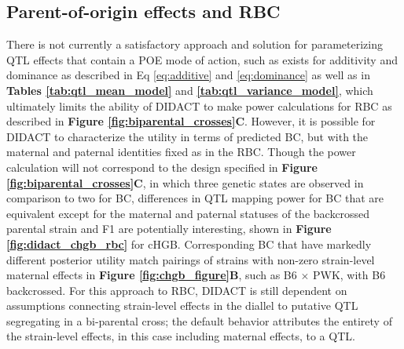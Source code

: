 \subsection{Parent-of-origin effects and RBC}

There is not currently a satisfactory approach and solution for parameterizing QTL effects that contain a POE mode of action, such as exists for additivity and dominance as described in Eq \ref{eq:additive} and \ref{eq:dominance} as well as in \textbf{Tables \ref{tab:qtl_mean_model}} and \textbf{\ref{tab:qtl_variance_model}}, which ultimately limits the ability of DIDACT to make power calculations for RBC as described in \textbf{Figure \ref{fig:biparental_crosses}C}. However, it is possible for DIDACT to characterize the utility in terms of predicted BC, but with the maternal and paternal identities fixed as in the RBC. Though the power calculation will not correspond to the design specified in \textbf{Figure \ref{fig:biparental_crosses}C}, in which three genetic states are observed in comparison to two for BC, differences in QTL mapping power for BC that are equivalent except for the maternal and paternal statuses of the backcrossed parental strain and F1 are potentially interesting, shown in \textbf{Figure \ref{fig:didact_chgb_rbc}} for cHGB. Corresponding BC that have markedly different posterior utility match pairings of strains with non-zero strain-level maternal effects in \textbf{Figure \ref{fig:chgb_figure}B}, such as B6 $\times$ PWK, with B6 backcrossed. For this approach to RBC, DIDACT is still dependent on assumptions connecting strain-level effects in the diallel to putative QTL segregating in a bi-parental cross; the default behavior attributes the entirety of the strain-level effects, in this case including maternal effects, to a QTL. 

